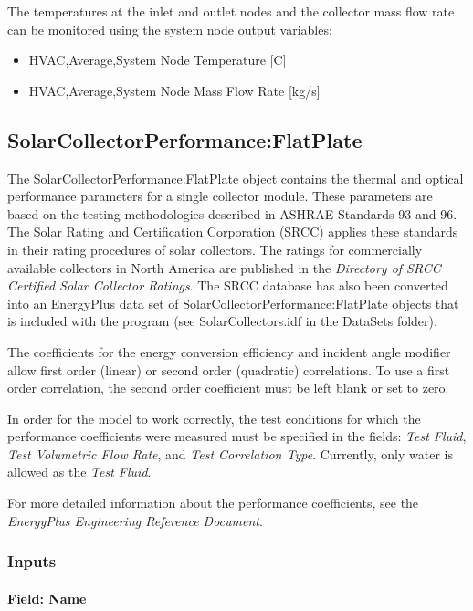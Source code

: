 The temperatures at the inlet and outlet nodes and the collector mass flow rate can be monitored using the system node output variables:

\begin{itemize}
\item
  HVAC,Average,System Node Temperature {[}C{]}
\item
  HVAC,Average,System Node Mass Flow Rate {[}kg/s{]}
\end{itemize}

\subsection{SolarCollectorPerformance:FlatPlate}\label{solarcollectorperformanceflatplate}

The SolarCollectorPerformance:FlatPlate object contains the thermal and optical performance parameters for a single collector module. These parameters are based on the testing methodologies described in ASHRAE Standards 93 and 96. The Solar Rating and Certification Corporation (SRCC) applies these standards in their rating procedures of solar collectors. The ratings for commercially available collectors in North America are published in the \emph{Directory of SRCC Certified Solar Collector Ratings}. The SRCC database has also been converted into an EnergyPlus data set of SolarCollectorPerformance:FlatPlate objects that is included with the program (see SolarCollectors.idf in the DataSets folder).

The coefficients for the energy conversion efficiency and incident angle modifier allow first order (linear) or second order (quadratic) correlations. To use a first order correlation, the second order coefficient must be left blank or set to zero.

In order for the model to work correctly, the test conditions for which the performance coefficients were measured must be specified in the fields: \emph{Test Fluid}, \emph{Test Volumetric Flow Rate}, and \emph{Test Correlation Type}. Currently, only water is allowed as the \emph{Test Fluid}.

For more detailed information about the performance coefficients, see the \emph{EnergyPlus Engineering Reference Document}.

\subsubsection{Inputs}\label{inputs-1-042}

\paragraph{Field: Name}\label{field-name-1-041}

